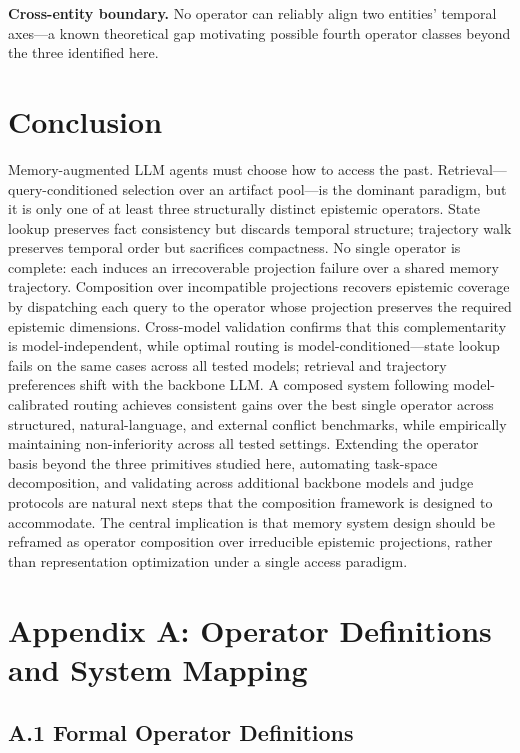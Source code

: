 \documentclass[letterpaper,twocolumn,10pt]{article}
\begin{document}
\textbf{Cross-entity boundary.} No operator can reliably align two entities' temporal axes---a known theoretical gap motivating possible fourth operator classes beyond the three identified here.

\section{Conclusion}

Memory-augmented LLM agents must choose how to access the past. Retrieval---query-conditioned selection over an artifact pool---is the dominant paradigm, but it is only one of at least three structurally distinct epistemic operators. State lookup preserves fact consistency but discards temporal structure; trajectory walk preserves temporal order but sacrifices compactness. No single operator is complete: each induces an irrecoverable projection failure over a shared memory trajectory. Composition over incompatible projections recovers epistemic coverage by dispatching each query to the operator whose projection preserves the required epistemic dimensions. Cross-model validation confirms that this complementarity is model-independent, while optimal routing is model-conditioned---state lookup fails on the same cases across all tested models; retrieval and trajectory preferences shift with the backbone LLM. A composed system following model-calibrated routing achieves consistent gains over the best single operator across structured, natural-language, and external conflict benchmarks, while empirically maintaining non-inferiority across all tested settings. Extending the operator basis beyond the three primitives studied here, automating task-space decomposition, and validating across additional backbone models and judge protocols are natural next steps that the composition framework is designed to accommodate. The central implication is that memory system design should be reframed as operator composition over irreducible epistemic projections, rather than representation optimization under a single access paradigm.


\appendix
\section*{Appendix A: Operator Definitions and System Mapping}
\subsection*{A.1 Formal Operator Definitions}
\end{document}
